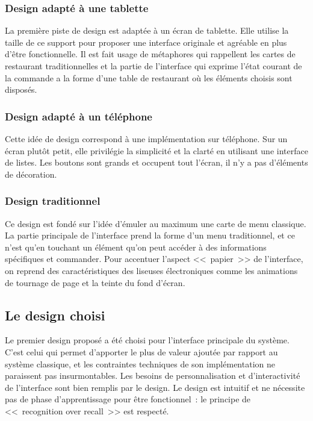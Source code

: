 \documentclass[a4paper,12pt]{article}
\begin{document}
\subsubsection{Design adapté à une tablette}

La première piste de design est adaptée à un écran de tablette. Elle utilise la taille de ce support pour proposer
une interface originale et agréable en plus d'être fonctionnelle. Il est fait usage de métaphores qui rappellent
les cartes de restaurant traditionnelles et la partie de l'interface qui exprime l'état courant de la commande
a la forme d'une table de restaurant où les éléments choisis sont disposés.

\subsubsection{Design adapté à un téléphone}

Cette idée de design correspond à une implémentation sur téléphone. Sur un écran plutôt petit, elle privilégie la
simplicité et la clarté en utilisant une interface de listes. Les boutons sont grands et occupent tout l'écran,
il n'y a pas d'éléments de décoration.

\subsubsection{Design traditionnel}

Ce design est fondé sur l'idée d'émuler au maximum une carte de menu classique. La partie principale de l'interface
prend la forme d'un menu traditionnel, et ce n'est qu'en touchant un élément qu'on peut accéder à des informations
spécifiques et commander. Pour accentuer l'aspect <<~papier~>> de l'interface, on reprend des caractéristiques des
liseuses électroniques comme les animations de tournage de page et la teinte du fond d'écran.

\subsection{Le design choisi}

Le premier design proposé a été choisi pour l'interface principale du système. C'est celui qui permet d'apporter
le plus de valeur ajoutée par rapport au système classique, et les contraintes techniques de son implémentation
ne paraissent pas insurmontables. Les besoins de personnalisation et d'interactivité de l'interface sont bien remplis
par le design. Le design est intuitif et ne nécessite pas de phase d'apprentissage pour être fonctionnel~: le
principe de <<~recognition over recall~>> est respecté.
\end{document}
